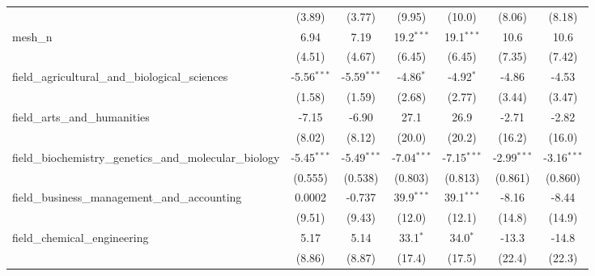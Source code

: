 \begin{tabular}{lcccccc}
                                                               & (3.89)         & (3.77)         & (9.95)        & (10.0)        & (8.06)         & (8.18)\\   
   mesh\_n                                                     & 6.94           & 7.19           & 19.2$^{***}$  & 19.1$^{***}$  & 10.6           & 10.6\\   
                                                               & (4.51)         & (4.67)         & (6.45)        & (6.45)        & (7.35)         & (7.42)\\   
   field\_agricultural\_and\_biological\_sciences              & -5.56$^{***}$  & -5.59$^{***}$  & -4.86$^{*}$   & -4.92$^{*}$   & -4.86          & -4.53\\   
                                                               & (1.58)         & (1.59)         & (2.68)        & (2.77)        & (3.44)         & (3.47)\\   
   field\_arts\_and\_humanities                                & -7.15          & -6.90          & 27.1          & 26.9          & -2.71          & -2.82\\   
                                                               & (8.02)         & (8.12)         & (20.0)        & (20.2)        & (16.2)         & (16.0)\\   
   field\_biochemistry\_genetics\_and\_molecular\_biology      & -5.45$^{***}$  & -5.49$^{***}$  & -7.04$^{***}$ & -7.15$^{***}$ & -2.99$^{***}$  & -3.16$^{***}$\\   
                                                               & (0.555)        & (0.538)        & (0.803)       & (0.813)       & (0.861)        & (0.860)\\   
   field\_business\_management\_and\_accounting                & 0.0002         & -0.737         & 39.9$^{***}$  & 39.1$^{***}$  & -8.16          & -8.44\\   
                                                               & (9.51)         & (9.43)         & (12.0)        & (12.1)        & (14.8)         & (14.9)\\   
   field\_chemical\_engineering                                & 5.17           & 5.14           & 33.1$^{*}$    & 34.0$^{*}$    & -13.3          & -14.8\\   
                                                               & (8.86)         & (8.87)         & (17.4)        & (17.5)        & (22.4)         & (22.3)\\   

\end{tabular}

